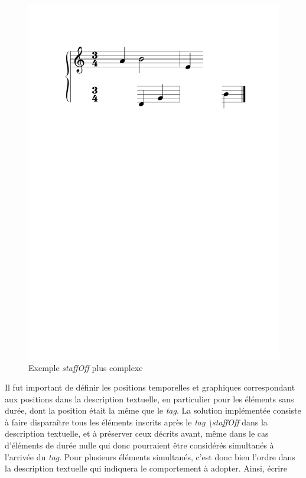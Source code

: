 \documentclass{article}
\begin{document}

\begin{figure}[h]
\centering
\includegraphics[width=0.8\columnwidth]{img/staffoffexotique.pdf}
\caption{ Exemple \emph{staffOff} plus complexe}
\label{fig:staffoffexotique}
\end{figure}

Il fut important de définir les positions temporelles et graphiques correspondant aux positions dans la description textuelle, en particulier pour les éléments sans durée, dont la position était la même que le \emph{tag}. La solution implémentée consiste à faire disparaître tous les éléments inscrits après le \emph{tag} \emph{\textbackslash{}staffOff} dans la description textuelle, et à préserver ceux décrits avant, même dans le cas d'éléments de durée nulle qui donc pourraient être considérés simultanés à l'arrivée du \emph{tag}. Pour plusieurs éléments simultanés, c'est donc bien l'ordre dans la description textuelle qui indiquera le comportement à adopter. Ainsi, écrire 
\end{document}
